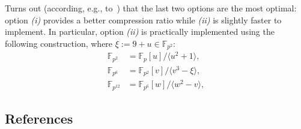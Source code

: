 \documentclass{template}
\begin{document}
\begin{example}
    Turns out (according, e.g., to~\cite{tower}) that the last two options are
    the most optimal: option \textcolor{red!80!purple}{\textit{(i)}} provides a
    better compression ratio while \textcolor{blue!80!black}{\textit{(ii)}} is
    slightly faster to implement. In particular, option
    \textcolor{blue!80!black}{\textit{(ii)}} is practically implemented using
    the following construction, where $\xi := 9+u \in \mathbb{F}_{p^2}$:
    \begin{align*}
        \mathbb{F}_{p^2} &= \mathbb{F}_p[u] / \langle u^2+1 \rangle, \\
        \mathbb{F}_{p^6} &= \mathbb{F}_{p^2}[v] / \langle v^3 - \xi \rangle, \\
        \mathbb{F}_{p^{12}} &= \mathbb{F}_{p^6}[w] / \langle w^2 - v \rangle,
    \end{align*}
\end{example}

\subsection*{References}
\footnotesize
\renewcommand{\refname}{\vspace{-1em}}


\end{document}
